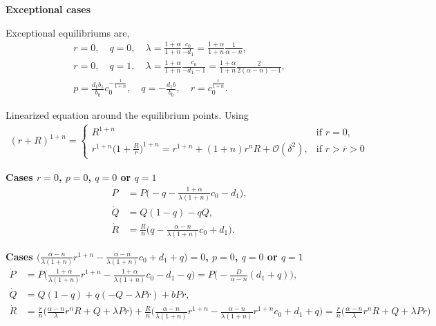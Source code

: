 \documentclass[a4paper,11pt]{article}
\begin{document}
\noindent
{\bf Exceptional cases}
\medskip

Exceptional equilibriums are,
\begin{align*}
 r=0, \quad q=0, \quad \lambda = \frac{1+\alpha}{1+n} \frac{c_0}{-d_1} = \frac{1+\alpha}{1+n} \frac{1}{\alpha-n},\\
 r=0, \quad q=1, \quad \lambda = \frac{1+\alpha}{1+n} \frac{c_0}{-d_1-1}= \frac{1+\alpha}{1+n} \frac{2}{2(\alpha-n)-1},\\
 p = \frac{d_1b_1}{b_0} c_0^{-\frac{1}{1+n}}, \quad q=-\frac{d_1 b}{b_0}, \quad r=c_0^{\frac{1}{1+n}}.
\end{align*}

Linearized equation around the equilibrium points. Using
\begin{align*}
 (r+R)^{1+n} = \begin{cases}
                R^{1+n} &\text{if $r=0$},\\
                r^{1+n}\Big(1+\frac{R}{r}\Big)^{1+n} = r^{1+n} + (1+n)r^nR + \mathcal{O}(\delta^2), & \text{if $r>\bar{r}>0$}                
               \end{cases}
\end{align*}

\noindent
{\bf Cases $r=0$, $p=0$, $q=0$ or $q=1$}
\begin{align*}
 \dot{P} &=P\Big(-q-\frac{1+\alpha}{\lambda(1+n)} c_0 -d_1\Big),\\
 \dot{Q} &=Q(1-q) -qQ,\\
 \dot{R} &=\frac{R}{n}\Big(q-\frac{\alpha-n}{\lambda(1+n)} c_0 +d_1 \Big).
\end{align*}

\noindent
{\bf Cases $\Big( \frac{\alpha-n}{\lambda(1+n)} r^{1+n} - \frac{\alpha-n}{\lambda(1+n)}c_0 + d_1 + q \Big)=0$, $p=0$, $q=0$ or $q=1$}
\begin{align*}
 \dot{P}&=P\Big( \frac{1+\alpha}{\lambda(1+n)} r^{1+n} - \frac{1+\alpha}{\lambda(1+n)} c_0 -d_1-q\Big) = P\Big(-\frac{D}{\alpha-n}(d_1+q)\Big),\\
 \dot{Q}&=Q(1-q) +q(-Q-\lambda Pr) + bPr,\\
 \dot{R}&=\frac{r}{n}\Big( \frac{\alpha-n}{\lambda} r^nR + Q + \lambda Pr\Big) + \frac{R}{n}\Big(\frac{\alpha-n}{\lambda(1+n)}r^{1+n}-\frac{\alpha-n}{\lambda(1+n)}r^{1+n}c_0 + d_1 +q\Big) = \frac{r}{n}\Big( \frac{\alpha-n}{\lambda} r^nR + Q + \lambda Pr\Big)
\end{align*}
\end{document}
